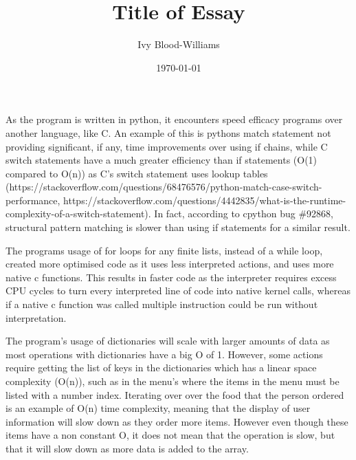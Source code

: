 \documentclass[12pt, a4paper]{article}
\title{Title of Essay}
\author{Ivy Blood-Williams}
\date{\today}
\begin{document}
\renewcommand{\baselinestretch}{1.5}
As the program is written in python, it encounters speed efficacy programs over another language, like C. An example of this is pythons match statement not providing significant, if any, time improvements over using if chains, while C switch statements have a much greater efficiency than if statements (O(1) compared to O(n)) as C's switch statement uses lookup tables (https://stackoverflow.com/questions/68476576/python-match-case-switch-performance, https://stackoverflow.com/questions/4442835/what-is-the-runtime-complexity-of-a-switch-statement). In fact, according to cpython bug \#92868, structural pattern matching is slower than using if statements for a similar result.

The programs usage of for loops for any finite lists, instead of a while loop, created more optimised code as it uses less interpreted actions, and uses more native c functions. This results in faster code as the interpreter requires excess CPU cycles to turn every interpreted line of code into native kernel calls, whereas if a native c function was called multiple instruction could be run without interpretation.

The program's usage of dictionaries will scale with larger amounts of data as most operations with dictionaries have a big O of 1. However, some actions require getting the list of keys in the dictionaries which has a linear space complexity (O(n)), such as in the menu's where the items in the menu must be listed with a number index. Iterating over over the food that the person ordered is an example of O(n) time complexity, meaning that the display of user information will slow down as they order more items. However even though these items have a non constant O, it does not mean that the operation is slow, but that it will slow down as more data is added to the array.
\end{document}
